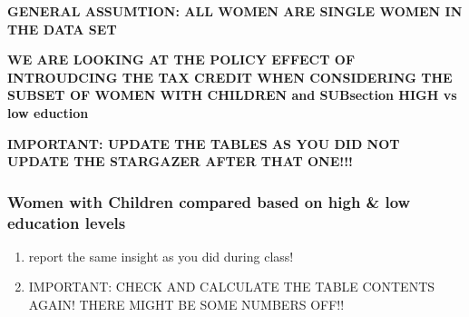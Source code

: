 \documentclass[a4paper]{article}
\begin{document}
\textbf{GENERAL ASSUMTION: ALL WOMEN ARE SINGLE WOMEN IN THE DATA SET}

\textbf{WE ARE LOOKING AT THE POLICY EFFECT OF INTROUDCING THE TAX CREDIT WHEN CONSIDERING THE SUBSET OF WOMEN WITH CHILDREN and SUBsection HIGH vs low eduction}


\textbf{IMPORTANT: UPDATE THE TABLES AS YOU DID NOT UPDATE THE STARGAZER AFTER THAT ONE!!!}


\subsubsection{Women with Children compared based on high \& low education levels}

\begin{enumerate}
   \item report the same insight as you did during class! 
   \item IMPORTANT: CHECK AND CALCULATE THE TABLE CONTENTS AGAIN! THERE MIGHT BE SOME NUMBERS OFF!!
\end{enumerate}
\end{document}
